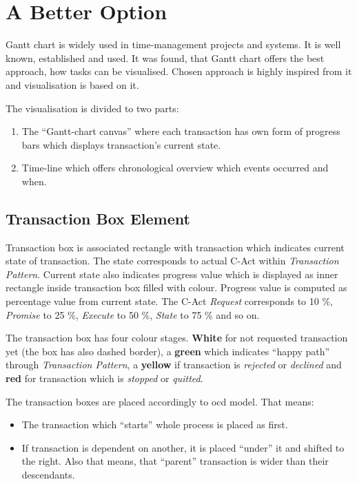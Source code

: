 \section{A Better Option}
Gantt chart is widely used in time-management projects and systems. It is well known, established and used. It was found, that Gantt chart offers the best approach, how tasks can be visualised. Chosen approach is highly inspired from it and visualisation is based on it. 

The visualisation is divided to two parts:
\begin{enumerate}
\item The ``Gantt-chart canvas'' where each transaction has own form of progress bars which displays transaction's current state.
\item Time-line which offers chronological overview which events occurred and when. 
\end{enumerate}
\subsection{Transaction Box Element}
Transaction box is associated rectangle with transaction which indicates current state of transaction. The state corresponds to actual C-Act within \textit{Transaction Pattern}. Current state also indicates progress value which is displayed as inner rectangle inside transaction box filled with colour. Progress value is computed as percentage value from current state. The C-Act \textit{Request} corresponds to 10 \%, \textit{Promise} to 25 \%, \textit{Execute} to 50 \%, \textit{State} to 75 \% and so on.  

The transaction box has four colour stages. \textbf{White} for not requested transaction yet (the box has also dashed border), a \textbf{green} which indicates ``happy path'' through \textit{Transaction Pattern}, a \textbf{yellow} if transaction is \textit{rejected} or \textit{declined} and \textbf{red} for transaction which is \textit{stopped} or \textit{quitted}. 

The transaction boxes are placed accordingly to \gls{ocd} model. That means:
\begin{itemize}
\item The transaction which ``starts'' whole process is placed as first. 
\item If transaction is dependent on another, it is placed ``under'' it and shifted to the right. Also that means, that ``parent'' transaction is wider than their descendants. 
\end{itemize}
